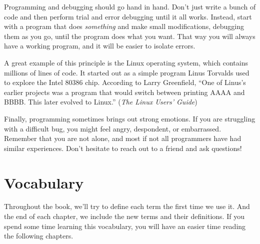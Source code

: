 \documentclass[12pt]{book}
\theoremstyle{exercise}
\begin{document}
Programming and debugging should go hand in hand.
Don't just write a bunch of code and then perform trial and error debugging until it all works.
Instead, start with a program that does {\em something} and make small modifications, debugging them as you go, until the program does what you want.
That way you will always have a working program, and it will be easier to isolate errors.


A great example of this principle is the Linux operating system, which contains millions of lines of code.
It started out as a simple program Linus Torvalds used to explore the Intel 80386 chip.
According to Larry Greenfield, ``One of Linus's earlier projects was a program that would switch between printing AAAA and BBBB.
This later evolved to Linux.'' ({\em The Linux Users' Guide})


Finally, programming sometimes brings out strong emotions.
If you are struggling with a difficult bug, you might feel angry, despondent, or embarrassed.
Remember that you are not alone, and most if not all programmers have had similar experiences.
Don't hesitate to reach out to a friend and ask questions!


\section{Vocabulary}

Throughout the book, we'll try to define each term the first time we use it.
And the end of each chapter, we include the new terms and their definitions.
If you spend some time learning this vocabulary, you will have an easier time reading the following chapters.
\end{document}
